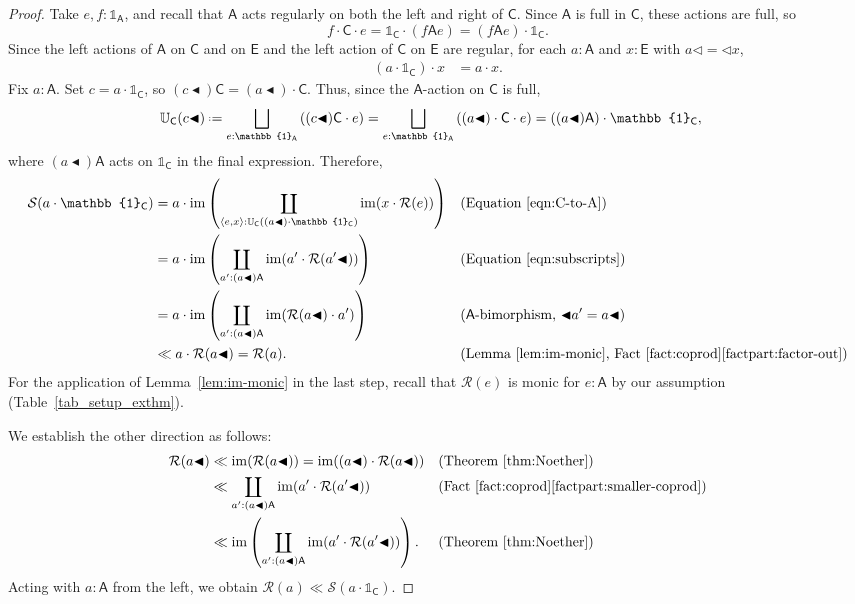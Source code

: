 \documentclass{amsart}
\newcommand{\acat}[1]{\mathsf{#1}}
\numberwithin{lstfloat}{section}
\newcommand{\srcfunc}{\mathbin{\blacktriangleleft}}
\newcommand{\tgtfunc}{\mathbin{\blacktriangleleft}}
\newcommand{\src}[1]{#1\srcfunc}
\newcommand{\tgt}[1]{\tgtfunc #1}
\newcommand{\one}{\mathbb{1}}
\newcommand{\defeq}{\mathrel{\hstretch{.13}{=}\hspace{.2ex}{=}}}
\newcommand{\func}[1]{\mathcal{#1}}
\newcommand{\fR}{\func{R}}
\newcommand{\fS}{\func{S}}
\theoremstyle{definition}
\theoremstyle{remark}
\numberwithin{equation}{section}
\begin{document}
\begin{proof}
  Take $e,f:\one_{\acat{A}}$, and recall that $\acat{A}$ acts regularly on both
  the left and right of $\acat{C}$. Since $\acat{A}$ is full in $\acat{C}$, 
these actions are full, so 
  \[
    f\cdot\acat{C}\cdot e = \one_{\acat{C}} \cdot (f\acat{A}e) = (f\acat{A}e) \cdot \one_{\acat{C}} . 
  \]
  Since the left actions of $\acat{A}$ on $\acat{C}$ and on $\acat{E}$ 
and the left action of $\acat{C}$ on $\acat{E}$ are regular, for each
  $a:\acat{A}$ and $x:\acat{E}$ with $a\lhd = \lhd x$,
  \begin{align}\label{eqn:C-to-A}
    (a\cdot \one_{\acat{C}}) \cdot x &= a\cdot x. 
  \end{align}
  Fix $a:\acat{A}$. Set $c = a\cdot\one_{\acat{C}}$, so $(\src{c})\acat{C} = (\src{a})\cdot
  \acat{C}$. Thus, since the $\acat{A}$-action on $\acat{C}$ is full,
  \begin{align}\label{eqn:subscripts}
    \mathbb{U}_{\acat{C}}(\src{c}) \defeq \bigsqcup_{e:\one_{\acat{A}}} \left((\src{c})\acat{C}\cdot e\right) &= \bigsqcup_{e:\one_{\acat{A}}} \left((\src{a})\cdot \acat{C}\cdot e\right) = ((\src{a})\acat{A})\cdot \one_{\acat{C}},
  \end{align}
  where $(\src{a})\acat{A}$ acts on $\one_{\acat{C}}$ in the final expression.
  Therefore, 
  \begin{align*}
    \fS(a\cdot\one_{\acat{C}}) 
    & = a\cdot \mathrm{im}\left(\coprod_{\langle e,x\rangle:\mathbb{U}_{\acat{C}}((\src{a})\cdot \one_{\acat{C}})} \mathrm{im}(x\cdot \fR(e))\right) 
        & & (\text{Equation \eqref{eqn:C-to-A}}) \\ 
    & = a\cdot \mathrm{im}\left(\coprod_{a':(\src{a})\acat{A}} \mathrm{im}(a'\cdot \fR(\src{a'}))\right) 
        & & (\text{Equation \eqref{eqn:subscripts}})\\
    & = a\cdot \mathrm{im}\left(\coprod_{a':(\src{a})\acat{A}} \mathrm{im}(\fR(\src{a})\cdot a')\right) 
        & & (\text{$\acat{A}$-bimorphism, $\tgt{a'} = \src{a}$})\\
    & \ll a\cdot \fR(\src{a}) = \fR(a).
    & & (\text{Lemma~\ref{lem:im-monic},  Fact~\ref{fact:coprod}\ref{factpart:factor-out}})
  \end{align*}
\noindent 
For the application of Lemma~\ref{lem:im-monic} in the last step, recall that 
$\func{R}(e)$ is monic for $e:\acat{A}$ by our assumption 
(Table~\ref{tab_setup_exthm}). 

We establish the other direction as follows:
  \begin{align*}
    \fR(\src{a}) &\ll \mathrm{im}(\fR(\src{a})) = \mathrm{im}((\src{a})\cdot \fR(\src{a})) & & (\text{Theorem~\ref{thm:Noether}}) \\
    &\ll \coprod_{a':(\src{a})\acat{A}} \mathrm{im}(a' \cdot \fR(\src{a'})) & & (\text{Fact~\ref{fact:coprod}\ref{factpart:smaller-coprod}}) \\
    &\ll \mathrm{im}\left(\coprod_{a':(\src{a})\acat{A}} \mathrm{im}(a' \cdot \fR(\src{a'}))\right). & & (\text{Theorem~\ref{thm:Noether}}) 
  \end{align*}
  Acting with $a:\acat{A}$ from the left, we obtain $\fR(a) \ll \fS(a\cdot \one_{\acat{C}})$.


\end{proof}
\end{document}
